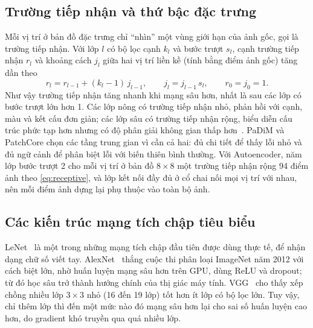\subsection{Trường tiếp nhận và thứ bậc đặc trưng}

Mỗi vị trí ở bản đồ đặc trưng chỉ ``nhìn'' một vùng giới hạn của ảnh gốc, gọi là trường tiếp nhận. Với lớp $l$ có bộ
lọc cạnh $k_l$ và bước trượt $s_l$, cạnh trường tiếp nhận $r_l$ và khoảng cách $j_l$ giữa hai vị trí liền kề (tính bằng
điểm ảnh gốc) tăng dần theo
\begin{equation}
  r_l = r_{l-1} + (k_l - 1)\, j_{l-1}, \qquad j_l = j_{l-1}\, s_l, \qquad r_0 = j_0 = 1 .
  \label{eq:receptive}
\end{equation}
Như vậy trường tiếp nhận tăng nhanh khi mạng sâu hơn, nhất là sau các lớp có bước trượt lớn hơn 1. Các lớp nông có
trường tiếp nhận nhỏ, phản hồi với cạnh, màu và kết cấu đơn giản; các lớp sâu có trường tiếp nhận rộng, biểu diễn
cấu trúc phức tạp hơn nhưng có độ phân giải không gian thấp hơn~\cite{yosinskiHowTransferableAre2014}. PaDiM và
PatchCore chọn các tầng trung gian vì cần cả hai: đủ chi tiết để thấy lỗi nhỏ và đủ ngữ cảnh để phân biệt lỗi với
biến thiên bình thường. Với Autoencoder, năm lớp bước trượt 2 cho mỗi vị trí ở bản đồ $8\times8$ một trường tiếp nhận
rộng 94 điểm ảnh theo \eqref{eq:receptive}, và lớp kết nối đầy đủ ở cổ chai nối mọi vị trí với nhau, nên mỗi điểm ảnh dựng lại phụ thuộc
vào toàn bộ ảnh.

\subsection{Các kiến trúc mạng tích chập tiêu biểu}
\label{sec:cnn-arch}

LeNet~\cite{lecunGradientbasedLearningApplied1998} là một trong những mạng tích chập đầu tiên được dùng thực tế, để
nhận dạng chữ số viết tay. AlexNet~\cite{krizhevskyImageNetClassificationDeep2012} thắng cuộc thi phân loại ImageNet
năm 2012 với cách biệt lớn, nhờ huấn luyện mạng sâu hơn trên GPU, dùng ReLU và dropout; từ đó học sâu trở thành hướng
chính của thị giác máy tính. VGG~\cite{simonyanVeryDeepConvolutional2015} cho thấy xếp chồng nhiều lớp $3\times3$ nhỏ
(16 đến 19 lớp) tốt hơn ít lớp có bộ lọc lớn. Tuy vậy, chỉ thêm lớp thì đến một mức nào đó mạng sâu hơn lại cho sai
số huấn luyện cao hơn, do gradient khó truyền qua quá nhiều lớp.

